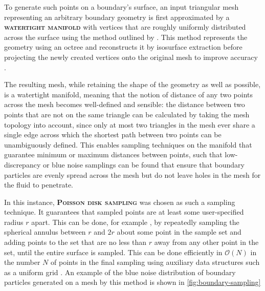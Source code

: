 \documentclass[oneside, a4paper]{book}
\newcommand\emphasis[1]{{\scshape\bfseries#1}}
\begin{document}
    To generate such points on a boundary's surface, an input triangular mesh representing an arbitrary boundary geometry is first approximated by a \emphasis{watertight manifold} with vertices that are roughly uniformly distributed across the surface using the method outlined by \autocite[Huang et al.]{mesh-watertight-manifold}. This method represents the geometry using an octree and reconstructs it by isosurface extraction before projecting the newly created vertices onto the original mesh to improve accuracy \autocite{mesh-watertight-manifold}.

    The resulting mesh, while retaining the shape of the geometry as well as possible, is a watertight manifold, meaning that the notion of distance of any two points across the mesh becomes well-defined and sensible: the distance between two points that are not on the same triangle can be calculated by taking the mesh topology into account, since only at most two triangles in the mesh ever share a single edge across which the shortest path between two points can be unambiguously defined. This enables sampling techniques on the manifold that guarantee minimum or maximum distances between points, such that low-discrepancy or blue noise samplings can be found that ensure that boundary particles are evenly spread across the mesh but do not leave holes in the mesh for the fluid to penetrate.

    In this instance, \emphasis{Poisson disk sampling} was chosen as such a sampling technique. It guarantees that sampled points are at least some user-specified radius $r$ apart. This can be done, for example \autocite{fast-poisson-disk-sampling}, by repeatedly sampling the spherical annulus between $r$ and $2r$ about some point in the sample set and adding points to the set that are no less than $r$ away from any other point in the set, until the entire surface is sampled. This can be done efficiently in $\mathcal{O}(N)$ in the number $N$ of points in the final sampling using auxiliary data structures such as a uniform grid \autocite{fast-poisson-disk-sampling}. An example of the blue noise distribution of boundary particles generated on a mesh by this method is shown in \autoref{fig:boundary-sampling}
\end{document}
